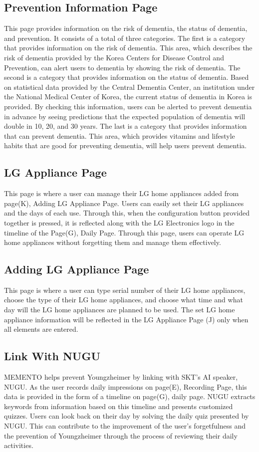 \documentclass[conference]{IEEEtran}
\begin{document}
\subsection{Prevention Information Page}
This page provides information on the risk of dementia, the status of dementia, and prevention. It consists of a total of three categories. The first is a category that provides information on the risk of dementia. This area, which describes the risk of dementia provided by the Korea Centers for Disease Control and Prevention, can alert users to dementia by showing the risk of dementia. The second is a category that provides information on the status of dementia. Based on statistical data provided by the Central Dementia Center, an institution under the National Medical Center of Korea, the current status of dementia in Korea is provided. By checking this information, users can be alerted to prevent dementia in advance by seeing predictions that the expected population of dementia will double in 10, 20, and 30 years. The last is a category that provides information that can prevent dementia. This area, which provides vitamins and lifestyle habits that are good for preventing dementia, will help users prevent dementia.
\\
\subsection{LG Appliance Page}
This page is where a user can manage their LG home appliances added from page(K), Adding LG Appliance Page. Users can easily set their LG appliances and the days of each use. Through this, when the configuration button provided together is pressed, it is reflected along with the LG Electronics logo in the timeline of the Page(G), Daily Page. 
Through this page, users can operate LG home appliances without forgetting them 
and manage them effectively.
\\
\subsection{Adding LG Appliance Page}
This page is where a user can type serial number of their LG home appliances, choose the type of their LG home appliances, and choose what time and what day will the LG home appliances are planned to be used. The set LG home appliance information will be reflected in the LG Appliance Page (J) only when all elements are entered.
\\
\subsection{Link With NUGU}
MEMENTO helps prevent Youngzheimer by linking with SKT’s AI speaker, NUGU. As the user records daily impressions on page(E), Recording Page, this data is provided in the form of a timeline on page(G), daily page. NUGU extracts keywords from information based on this timeline and presents customized quizzes. Users can look back on their day by solving the daily quiz presented by NUGU. This can contribute to the improvement of the user's forgetfulness and the prevention of Youngzheimer through the process of reviewing their daily activities.
\\
\end{document}
